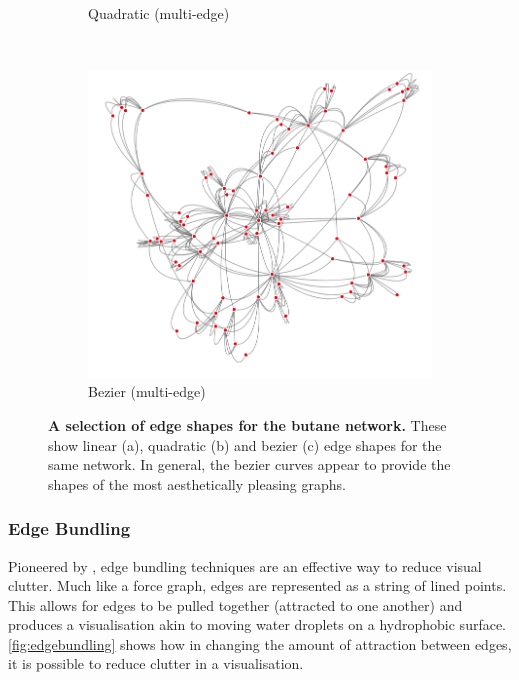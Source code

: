 \begin{figure}[H]
\begin{subfigure}[b]{.292\textheight}
     \caption{Quadratic (multi-edge)}
     \end{subfigure}\\
     \begin{subfigure}[b]{.292\textheight}
         \centering
     \includegraphics[width=\textwidth]{figures_c1/edgetype/multibeziergray.png}
     \caption{Bezier (multi-edge)}
     \end{subfigure}
        \caption{\textbf{A selection of edge shapes for the butane network.} These show linear (a), quadratic (b) and bezier (c) edge shapes for the same network. In general, the bezier curves appear to provide the shapes of the most aesthetically pleasing graphs.       }
      \label{fig:curvededge}
\end{figure}








\subsubsection{Edge Bundling }
Pioneered by \cite{bundlepioneer}, edge bundling techniques are an effective way to reduce visual clutter. Much like a force graph, edges are represented as a string of lined points. This allows for edges to be pulled together (attracted to one another) and produces a visualisation akin to moving water droplets on a hydrophobic surface. \autoref{fig:edgebundling} shows how in changing the amount of attraction between edges, it is possible to reduce clutter in a visualisation.


